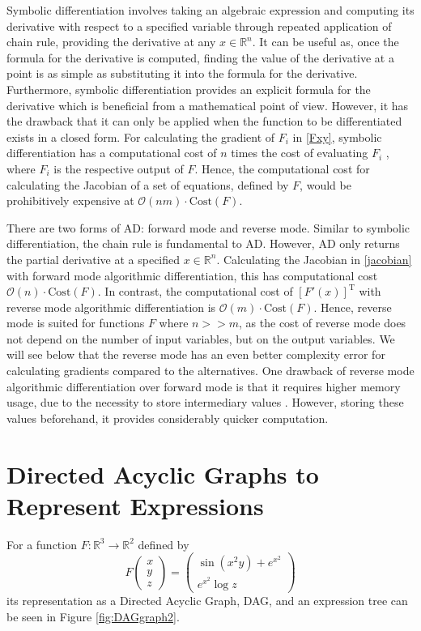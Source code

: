 \documentclass{article}
\begin{document}
Symbolic differentiation involves taking an algebraic expression and computing its derivative with respect to a specified variable through repeated application of chain rule, providing the derivative at any $x \in \mathbb{R}^n$. It can be useful as, once the formula for the derivative is computed, finding the value of the derivative at a point is as simple as substituting it into the formula for the derivative.  Furthermore, symbolic differentiation provides an explicit formula for the derivative which is beneficial from a mathematical point of view. However, it has the drawback that it can only be applied when the function to be differentiated exists in a closed form. For calculating the gradient of $F_i$ in \eqref{Fxy}, symbolic differentiation has a computational cost of $n$ times the cost of evaluating $F_i$ \cite{chem}, where $F_i$ is the respective output of $F$. Hence, the computational cost for calculating the Jacobian of a set of equations, defined by $F$, would be prohibitively expensive at $\mathcal{O}(n m)\cdot \mathrm{Cost}(F)$.

There are two forms of AD: forward mode and reverse mode. Similar to symbolic differentiation, the chain rule is fundamental to AD. However, AD only returns the partial derivative at a specified $x \in \mathbb{R}^n$. Calculating the Jacobian in \eqref{jacobian} with forward mode algorithmic differentiation, this has computational cost $\mathcal{O}(n)\cdot \mathrm{Cost}(F)$. In contrast, the computational cost of $[F'(x)]^\text{T}$ with reverse mode algorithmic differentiation is $\mathcal{O}(m)\cdot \mathrm{Cost}(F)$\cite{falisse}. Hence, reverse mode is suited for functions $F$ where $n >> m$, as the cost of reverse mode does not depend on the number of input variables, but on the output variables. We will see below that the reverse mode has an even better complexity error for calculating gradients compared to the alternatives. One drawback of reverse mode algorithmic differentiation over forward mode is that it requires higher memory usage, due to the necessity to store intermediary values \cite{dhamarticle}. However, storing these values beforehand, it provides considerably quicker computation.

\section{Directed Acyclic Graphs to Represent Expressions}

For a function $F: \mathbb{R}^3 \rightarrow \mathbb{R}^2$ defined by
\begin{equation} \label{example1}
    F \begin{pmatrix}
        x \\ y \\ z
    \end{pmatrix} = \begin{pmatrix}
        \sin (x^2 y) + e^{x^2} \\ e^{x^2} \log z
    \end{pmatrix}
\end{equation}
its representation as a Directed Acyclic Graph, DAG, and an expression tree can be seen in Figure \ref{fig:DAGgraph2}.
\end{document}
